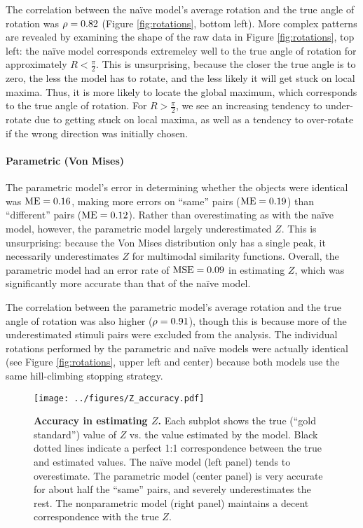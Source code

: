 \documentclass{article} %
\newcommand{\naive}[0]{na\"ive}
\begin{document}
The correlation between the \naive{} model's average rotation and the
true angle of rotation was $\rho=0.82{}$ (Figure \ref{fig:rotations},
bottom left). More complex patterns are revealed by examining the
shape of the raw data in Figure \ref{fig:rotations}, top left: the
\naive{} model corresponds extremeley well to the true angle of
rotation for approximately $R<\frac{\pi}{2}$. This is unsurprising,
because the closer the true angle is to zero, the less the model has
to rotate, and the less likely it will get stuck on local
maxima. Thus, it is more likely to locate the global maximum, which
corresponds to the true angle of rotation. For $R>\frac{\pi}{2}$, we
see an increasing tendency to under-rotate due to getting stuck on
local maxima, as well as a tendency to over-rotate if the wrong
direction was initially chosen.


\paragraph{Parametric (Von Mises)}

The parametric model's error in determining whether the objects were
identical was $\mathrm{ME}{}=0.16{}$, making more errors on ``same'' pairs
($\mathrm{ME}{}=0.19{}$) than ``different'' pairs ($\mathrm{ME}{}=0.12{}$). Rather than
overestimating as with the \naive{} model, however, the parametric
model largely underestimated $Z$. This is unsurprising: because the
Von Mises distribution only has a single peak, it necessarily
underestimates $Z$ for multimodal similarity functions. Overall, the
parametric model had an error rate of $\mathrm{MSE}{}=0.09{}$ in estimating $Z$,
which was significantly more accurate than that of the \naive{} model.

The correlation between the parametric model's average rotation and
the true angle of rotation was also higher ($\rho=0.91{}$), though this
is because more of the underestimated stimuli pairs were excluded from
the analysis. The individual rotations performed by the parametric and
\naive{} models were actually identical (see Figure
\ref{fig:rotations}, upper left and center) because both models use
the same hill-climbing stopping strategy.


\begin{figure}[t]
  \centering
  \texttt{[image: ../figures/Z\_accuracy.pdf]}
  \caption{\textbf{Accuracy in estimating $Z$.} Each subplot shows the
    true (``gold standard'') value of $Z$ vs. the value estimated by
    the model. Black dotted lines indicate a perfect 1:1
    correspondence between the true and estimated values. The \naive{}
    model (left panel) tends to overestimate. The parametric model
    (center panel) is very accurate for about half the ``same'' pairs,
    and severely underestimates the rest. The nonparametric model
    (right panel) maintains a decent correspondence with the true
    $Z$.}
  \label{fig:accuracy}
\end{figure}
\end{document}
